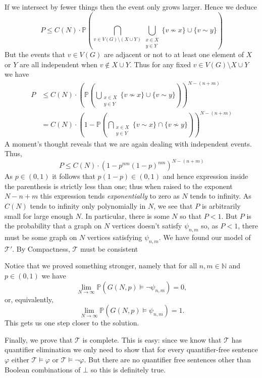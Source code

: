 \documentclass{article}
\begin{document}
\begin{enumerate}[leftmargin=*]
		If we intersect by fewer things then the event only grows larger. Hence we deduce
		\[
		P \leq C(N)\cdot\mathbb{P}\left(\bigcap_{v\in V(G)\setminus(X\cup Y)} \bigcup_{\substack{x\in X \\ y\in Y}} \{v\nsim x\}\cup \{v\sim y\}\right)
		\]
		But the events that $v\in V(G)$ are adjacent or not to at least one element of $X$ or $Y$ are all independent when $v\notin X\cup Y$. Thus for any fixed $v\in V(G)\setminus X\cup Y$ we have
		\begin{align*}
			P &\leq C(N)\cdot \left(\mathbb{P}\left(\bigcup_{\substack{x\in X \\ y\in Y}} \{v\nsim x\}\cup \{v\sim y\}\right)\right)^{N - (n+m)}\\
			&= C(N)\cdot \left(1 - \mathbb{P}\left(\bigcap_{\substack{x\in X \\ y\in Y}} \{v\sim x\}\cap \{v\nsim y\}\right)\right)^{N - (n+m)}
		\end{align*}
		A moment's thought reveals that we are again dealing with independent events. Thus,
		\begin{equation*}
			P \leq C(N)\cdot (1 - p^{nm}(1-p)^{nm})^{N - (n+m)}
		\end{equation*}
		As $p\in(0,1)$ it follows that $p(1-p)\in (0,1)$ and hence expression inside the parenthesis is strictly less than one; thus when raised to the exponent $N - n + m$ this expression tends \emph{exponentially} to zero as $N$ tends to infinity. As $C(N)$ tends to infinity only polynomially in $N$, we see that $P$ is arbitrarily small for large enough $N$. In particular, there is some $N$ so that $P < 1$. But $P$ is the probability that a graph on $N$ vertices doesn't satisfy $\psi_{n,m}$ so, as $P<1$, there must be some graph on $N$ vertices satisfying $\psi_{n,m}$. We have found our model of $\mathcal{T}'$.	By Compactness, $\mathcal{T}$ must be consistent
		
		Notice that we proved something stronger, namely that for all $n,m\in\mathbb{N}$ and $p\in(0,1)$ we have
		\[
			\lim_{N\to \infty} \mathbb{P}(G(N,p) \models \neg \psi_{n,m}) = 0,
		\]
		or, equivalently,
		\[
			\lim_{N\to \infty} \mathbb{P}(G(N,p) \models \psi_{n,m}) = 1.
		\]
		This gets us one step closer to the solution.
		
		Finally, we prove that $\mathcal{T}$ is complete. This is easy: since we know that $\mathcal{T}$ has quantifier elimination we only need to show that for every quantifier-free sentence $\varphi$ either $\mathcal{T}\models \varphi$ or $\mathcal{T}\models \neg\varphi$. But there are no quantifier free sentences other than Boolean combinations of $\bot$ so this is definitely true. 
		

\end{enumerate}
\end{document}
